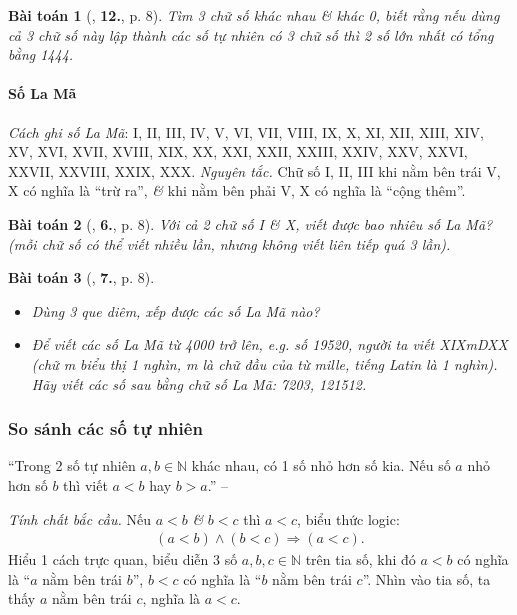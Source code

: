 \documentclass{article}
\numberwithin{equation}{section}
\newtheorem{baitoan}{Bài toán}[section]
\begin{document}
\begin{baitoan}[\cite{Binh_Toan_6_tap_1}, \textbf{12.}, p. 8]
	Tìm 3 chữ số khác nhau \& khác 0, biết rằng nếu dùng cả 3 chữ số này lập thành các số tự nhiên có 3 chữ số thì 2 số lớn nhất có tổng bằng 1444.
\end{baitoan}	

\paragraph{Số La Mã}
\textit{Cách ghi số La Mã}: I, II, III, IV, V, VI, VII, VIII, IX, X, XI, XII, XIII, XIV, XV, XVI, XVII, XVIII, XIX, XX, XXI, XXII, XXIII, XXIV, XXV, XXVI, XXVII, XXVIII, XXIX, XXX. \textit{Nguyên tắc.} Chữ số I, II, III khi nằm bên trái V, X có nghĩa là ``trừ ra'', \textit{\&} khi nằm bên phải V, X có nghĩa là ``cộng thêm''.

\begin{baitoan}[\cite{Binh_Toan_6_tap_1}, \textbf{6.}, p. 8]
	Với cả 2 chữ số I \& X, viết được bao nhiêu số La Mã? (mỗi chữ số có thể viết nhiều lần, nhưng không viết liên tiếp quá 3 lần).
\end{baitoan}

\begin{baitoan}[\cite{Binh_Toan_6_tap_1}, \textbf{7.}, p. 8]
	\begin{itemize}
		\item[(a)] Dùng 3 que diêm, xếp được các số La Mã nào?
		\item[(b)] Để viết các số La Mã từ 4000 trở lên, e.g. số 19520, người ta viết XIXmDXX (chữ m biểu thị \emph{1 nghìn}, m là chữ đầu của từ \emph{mille}, tiếng Latin là 1 nghìn). Hãy viết các số sau bằng chữ số La Mã: 7203, 121512.
	\end{itemize}
\end{baitoan}

\subsubsection{So sánh các số tự nhiên}
``Trong 2 số tự nhiên $a,b\in\mathbb{N}$ khác nhau, có 1 số nhỏ hơn số kia. Nếu số $a$ nhỏ hơn số $b$ thì viết $a < b$ hay $b > a$.'' -- \cite[p. 12]{SGK_Toan_6_Canh_Dieu_tap_1}

\noindent\textit{Tính chất bắc cầu.} Nếu $a < b$ \textit{\&} $b < c$ thì $a < c$, biểu thức logic:
\begin{align*}
	(a < b)\land(b < c)\Rightarrow(a < c).
\end{align*}
Hiểu 1 cách trực quan, biểu diễn 3 số $a,b,c\in\mathbb{N}$ trên tia số, khi đó $a < b$ có nghĩa là ``$a$ nằm bên trái $b$'', $b < c$ có nghĩa là ``$b$ nằm bên trái $c$''. Nhìn vào tia số, ta thấy $a$ nằm bên trái $c$, nghĩa là $a < c$.
\end{document}
